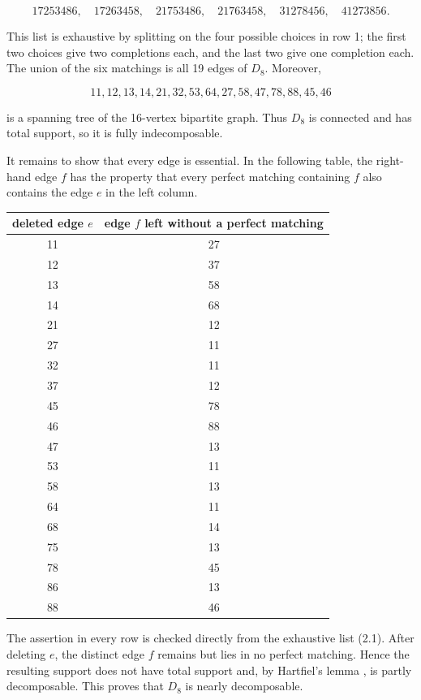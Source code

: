 \documentclass[11pt]{article}
\theoremstyle{definition}
\begin{document}
\[
17253486,\quad17263458,\quad21753486,\quad21763458,
\quad31278456,\quad41273856.                 \tag{2.1}
\]

This list is exhaustive by splitting on the four possible choices in row 1;
the first two choices give two completions each, and the last two give one
completion each. The union of the six matchings is all 19 edges of \(D_8\).
Moreover,

\[
11,12,13,14,21,32,53,64,27,58,47,78,88,45,46              \tag{2.2}
\]

is a spanning tree of the 16-vertex bipartite graph. Thus \(D_8\) is
connected and has total support, so it is fully indecomposable.

It remains to show that every edge is essential. In the following table, the
right-hand edge \(f\) has the property that every perfect matching containing
\(f\) also contains the edge \(e\) in the left column.

\begin{center}
\begin{tabular}{cc}
\hline
deleted edge \(e\) & edge \(f\) left without a perfect matching \\
\hline
11 & 27 \\
12 & 37 \\
13 & 58 \\
14 & 68 \\
21 & 12 \\
27 & 11 \\
32 & 11 \\
37 & 12 \\
45 & 78 \\
46 & 88 \\
47 & 13 \\
53 & 11 \\
58 & 13 \\
64 & 11 \\
68 & 14 \\
75 & 13 \\
78 & 45 \\
86 & 13 \\
88 & 46 \\
\hline
\end{tabular}
\end{center}

The assertion in every row is checked directly from the exhaustive list
(2.1). After deleting \(e\), the distinct edge \(f\) remains but lies in no
perfect matching. Hence the resulting support does not have total support and,
by Hartfiel's lemma \cite[p.~224]{hartfiel1971}, is partly decomposable. This
proves that \(D_8\) is nearly decomposable.
\end{document}
